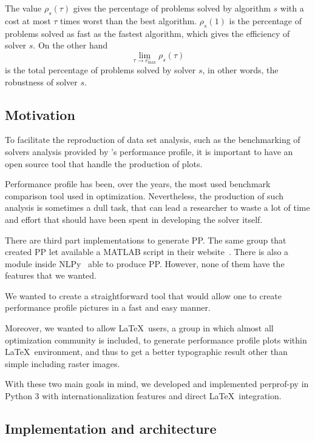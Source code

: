     The value $\rho_s(\tau)$ gives the percentage of problems solved by
    algorithm $s$ with a cost at most $\tau$ times worst than the best
    algorithm. $\rho_s(1)$ is the percentage of problems solved as fast as the
    fastest algorithm, which gives the efficiency of solver $s$.
    On the other hand \[\displaystyle \lim_{\tau\rightarrow r^-_{\max}}
    \rho_s(\tau)\] is the total percentage of problems solved by solver $s$, in
    other words, the robustness of solver $s$.

\subsection*{Motivation}

    To facilitate the reproduction of data set analysis, such as the
    benchmarking of solvers analysis provided by \citeauthor{Dolan:2002du}'s
    performance profile, it is important to have an open source tool that handle
    the production of plots.

    Performance profile has been, over the years, the most used benchmark
    comparison tool used in optimization. Nevertheless, the production of such
    analysis is sometimes a  dull task, that can lead a researcher to waste a lot of    time and effort that should have been spent in developing the solver   itself. 

    There are  third part implementations to generate PP. The same group that created PP let available a MATLAB script in their website~\cite{url:cops}. There is also a module inside NLPy~\cite{url:NLPpy} able to produce PP. However, none of them have the features that we wanted. 

    We wanted to create  a straightforward  tool that would allow one to create   performance profile pictures in a fast and easy manner.

    Moreover,  we wanted to allow \LaTeX\ users, a group in which almost all
    optimization community is included,  to   generate performance profile
    plots within \LaTeX\ environment, and thus to get a better typographic
    result other than simple including raster  images.

    With these two main goals in mind, we developed and implemented perprof-py
    in Python 3 with internationalization features and direct \LaTeX\
    integration.

\subsection*{Implementation and architecture}

